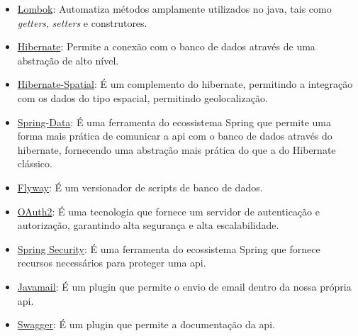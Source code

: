 \begin{itemize}

	\item \underline{Lombok}: Automatiza métodos amplamente utilizados no java, tais como \textit{getters}, \textit{setters} e construtores.

	\item \underline{Hibernate}: Permite a conexão com o banco de dados através de uma abstração de alto nível.	
	
	\item \underline{Hibernate-Spatial}: É um complemento do hibernate, permitindo a integração com os dados do tipo espacial, permitindo geolocalização.
	
	\item \underline{Spring-Data}: É uma ferramenta do ecossistema Spring que permite uma forma mais prática de comunicar a \gls{api} com o banco de dados através do hibernate, fornecendo uma abstração mais prática do que a do Hibernate clássico.
	
	\item \underline{Flyway}: É um versionador de scripts de banco de dados.
	
	\item \underline{OAuth2}: É uma tecnologia que fornece um servidor de autenticação e autorização, garantindo alta segurança e alta escalabilidade.
	
	\item \underline{Spring Security}: É uma ferramenta do ecossistema Spring que fornece recursos necessários para proteger uma \gls{api}.
	
	\item \underline{Javamail}: É um plugin que permite o envio de email dentro da nossa própria \gls{api}.
	
	\item \underline{Swagger}: É um plugin que permite a documentação da \gls{api}.
	
\end{itemize}

